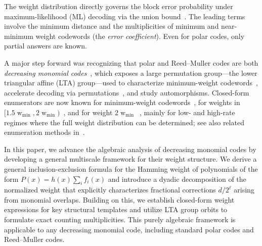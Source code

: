 \documentclass[conference]{IEEEtran}
\theoremstyle{definition}
\DeclareMathOperator{\w}{w}
\newcommand{\wm}{\w_{\min}}
\begin{document}
The weight distribution directly governs the block error probability under maximum-likelihood (ML) decoding via the union bound~\cite[Sect.~10.1]{lin_costello}. The leading terms involve the minimum distance and the multiplicities of minimum and near-minimum weight codewords (the \emph{error coefficient}). Even for polar codes, only partial answers are known.

A major step forward was recognizing that polar and Reed–Muller codes are both \emph{decreasing monomial codes}~\cite{bardet2016crypt,bardet}, which exposes a large permutation group—the lower triangular affine (LTA) group—used to characterize minimum-weight codewords~\cite{bardet}, accelerate decoding via permutations~\cite{GEECB21}, and study automorphisms. Closed-form enumerators are now known for minimum-weight codewords~\cite{bardet,rowshan2023formation}, for weights in $[1.5\wm,2\wm)$~\cite{vlad1.5d,ye2024distribution,rowshan2024weight,dragoi2025weight}, and for weight $2\wm$~\cite{rowshan2024weight}, mainly for low- and high-rate regimes where the full weight distribution can be determined; see also related enumeration methods in~\cite{yao,ellouze2023low,liu2025parity}.

In this paper, we advance the algebraic analysis of decreasing monomial codes by developing a general multiscale framework for their weight structure. We derive a general inclusion-exclusion formula for the Hamming weight of polynomials of the form $P(x)=h(x) \sum_i f_i(x)$ and introduce a dyadic decomposition of the normalized weight that explicitly characterizes fractional corrections $d / 2^{\ell}$ arising from monomial overlaps. Building on this, we establish closed-form weight expressions for key structural templates and utilize LTA group orbits to formulate exact counting multiplicities. This purely algebraic framework is applicable to any decreasing monomial code, including standard polar codes and Reed--Muller codes. 
\end{document}
